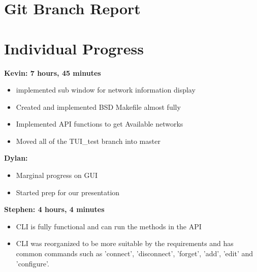 \documentclass[11pt]{article}
\begin{document}
\section{Git Branch Report}

\newpage
\section{Individual Progress}

\textbf{Kevin: 7 hours, 45 minutes}
\begin{itemize}
  \item implemented sub window for network information display
  \item Created and implemented BSD Makefile almost fully
  \item Implemented API functions to get Available networks
  \item Moved all of the TUI_test branch into master
\end{itemize}

\textbf{Dylan:}
\begin{itemize}
  \item Marginal progress on GUI
  \item Started prep for our presentation
\end{itemize}

\textbf{Stephen: 4 hours, 4 minutes}
\begin{itemize}
  \item CLI is fully functional and can run the methods in the API 
  \item CLI was reorganized to be more suitable by the requirements and has 
	common commands such as 'connect', 'disconnect', 'forget', 'add', 'edit' 
	and 'configure'.
\end{itemize}
\end{document}
